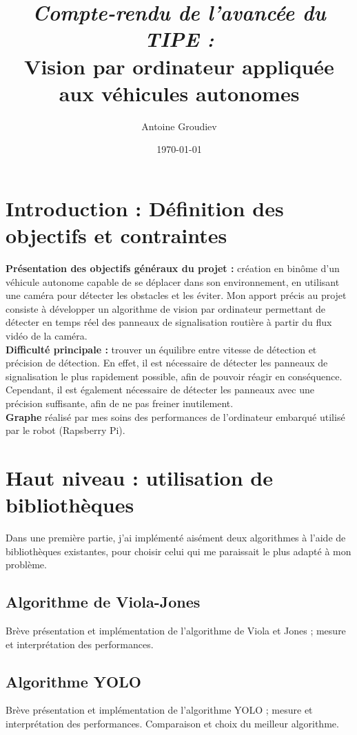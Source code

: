 \documentclass[12pt,a4paper]{article}
\author{Antoine Groudiev}
\title{\textit{Compte-rendu de l'avancée du TIPE :} \\ Vision par ordinateur appliquée aux véhicules autonomes}
\date{\today}
\begin{document}
\maketitle

\section*{Introduction : Définition des objectifs et contraintes}
\textbf{Présentation des objectifs généraux du projet :} création en binôme d'un véhicule autonome capable de se déplacer dans son environnement, en utilisant une caméra pour détecter les obstacles et les éviter. Mon apport précis au projet consiste à développer un algorithme de vision par ordinateur permettant de détecter en temps réel des panneaux de signalisation routière à partir du flux vidéo de la caméra. \\

\textbf{Difficulté principale :} trouver un équilibre entre vitesse de détection et précision de détection. En effet, il est nécessaire de détecter les panneaux de signalisation le plus rapidement possible, afin de pouvoir réagir en conséquence. Cependant, il est également nécessaire de détecter les panneaux avec une précision suffisante, afin de ne pas freiner inutilement. \\

\textbf{Graphe} réalisé par mes soins des performances de l'ordinateur embarqué utilisé par le robot (Rapsberry Pi).

\section{Haut niveau : utilisation de bibliothèques}
Dans une première partie, j'ai implémenté aisément deux algorithmes à l'aide de bibliothèques existantes, pour choisir celui qui me paraissait le plus adapté à mon problème.

\subsection{Algorithme de Viola-Jones}
Brève présentation et implémentation de l'algorithme de Viola et Jones ; mesure et interprétation des performances.

\subsection{Algorithme YOLO}
Brève présentation et implémentation de l'algorithme YOLO ; mesure et interprétation des performances. Comparaison et choix du meilleur algorithme.
\end{document}
